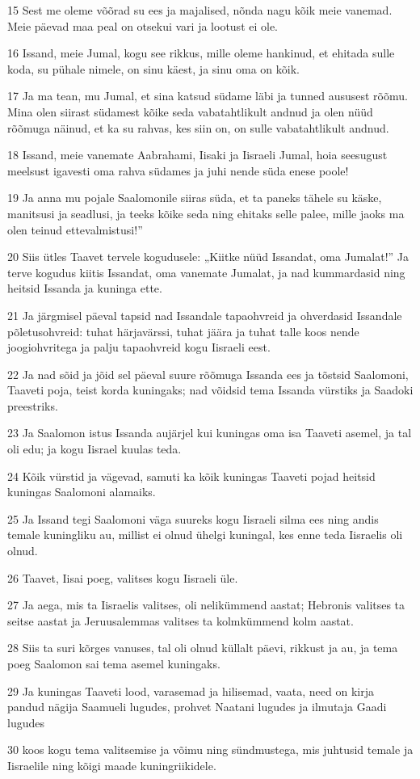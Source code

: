 \par 15 Sest me oleme võõrad su ees ja majalised, nõnda nagu kõik meie vanemad. Meie päevad maa peal on otsekui vari ja lootust ei ole.
\par 16 Issand, meie Jumal, kogu see rikkus, mille oleme hankinud, et ehitada sulle koda, su pühale nimele, on sinu käest, ja sinu oma on kõik.
\par 17 Ja ma tean, mu Jumal, et sina katsud südame läbi ja tunned aususest rõõmu. Mina olen siirast südamest kõike seda vabatahtlikult andnud ja olen nüüd rõõmuga näinud, et ka su rahvas, kes siin on, on sulle vabatahtlikult andnud.
\par 18 Issand, meie vanemate Aabrahami, Iisaki ja Iisraeli Jumal, hoia seesugust meelsust igavesti oma rahva südames ja juhi nende süda enese poole!
\par 19 Ja anna mu pojale Saalomonile siiras süda, et ta paneks tähele su käske, manitsusi ja seadlusi, ja teeks kõike seda ning ehitaks selle palee, mille jaoks ma olen teinud ettevalmistusi!”
\par 20 Siis ütles Taavet tervele kogudusele: „Kiitke nüüd Issandat, oma Jumalat!” Ja terve kogudus kiitis Issandat, oma vanemate Jumalat, ja nad kummardasid ning heitsid Issanda ja kuninga ette.
\par 21 Ja järgmisel päeval tapsid nad Issandale tapaohvreid ja ohverdasid Issandale põletusohvreid: tuhat härjavärssi, tuhat jäära ja tuhat talle koos nende joogiohvritega ja palju tapaohvreid kogu Iisraeli eest.
\par 22 Ja nad sõid ja jõid sel päeval suure rõõmuga Issanda ees ja tõstsid Saalomoni, Taaveti poja, teist korda kuningaks; nad võidsid tema Issanda vürstiks ja Saadoki preestriks.
\par 23 Ja Saalomon istus Issanda aujärjel kui kuningas oma isa Taaveti asemel, ja tal oli edu; ja kogu Iisrael kuulas teda.
\par 24 Kõik vürstid ja vägevad, samuti ka kõik kuningas Taaveti pojad heitsid kuningas Saalomoni alamaiks.
\par 25 Ja Issand tegi Saalomoni väga suureks kogu Iisraeli silma ees ning andis temale kuningliku au, millist ei olnud ühelgi kuningal, kes enne teda Iisraelis oli olnud.
\par 26 Taavet, Iisai poeg, valitses kogu Iisraeli üle.
\par 27 Ja aega, mis ta Iisraelis valitses, oli nelikümmend aastat; Hebronis valitses ta seitse aastat ja Jeruusalemmas valitses ta kolmkümmend kolm aastat.
\par 28 Siis ta suri kõrges vanuses, tal oli olnud küllalt päevi, rikkust ja au, ja tema poeg Saalomon sai tema asemel kuningaks.
\par 29 Ja kuningas Taaveti lood, varasemad ja hilisemad, vaata, need on kirja pandud nägija Saamueli lugudes, prohvet Naatani lugudes ja ilmutaja Gaadi lugudes
\par 30 koos kogu tema valitsemise ja võimu ning sündmustega, mis juhtusid temale ja Iisraelile ning kõigi maade kuningriikidele.



